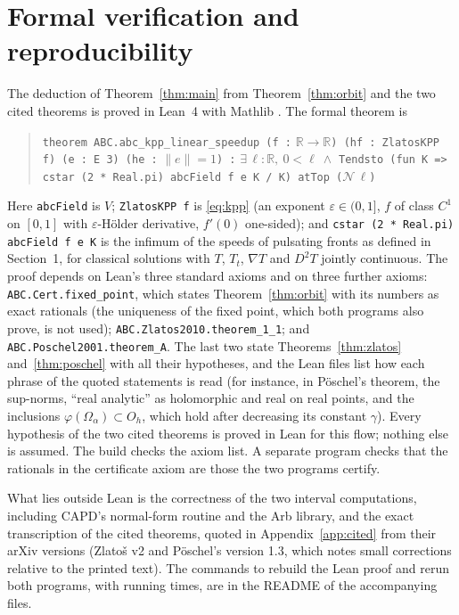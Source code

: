 \documentclass[11pt]{article}
\theoremstyle{definition}
\theoremstyle{remark}
\newcommand{\R}{\mathbb{R}}
\begin{document}
\section{Formal verification and reproducibility}\label{sec:lean}
The deduction of Theorem~\ref{thm:main} from Theorem~\ref{thm:orbit} and the
two cited theorems is proved in Lean~4 \cite{Lean} with Mathlib
\cite{Mathlib}. The formal theorem is
\begin{quote}\raggedright
\texttt{theorem ABC.abc\_kpp\_linear\_speedup (f :} $\R\to\R$\texttt{) (hf : ZlatosKPP f) (e : E 3) (he :} $\|e\|=1$\texttt{) :}
$\exists\,\ell:\R,\ 0<\ell\ \wedge$ \texttt{Tendsto (fun K => cstar (2 * Real.pi) abcField f e K / K) atTop (}$\mathcal N\,\ell$\texttt{)}
\end{quote}
Here \texttt{abcField} is $V$; \texttt{ZlatosKPP f} is \eqref{eq:kpp} (an
exponent $\varepsilon\in(0,1]$, $f$ of class $C^1$ on $[0,1]$ with
$\varepsilon$-Hölder derivative, $f'(0)$ one-sided); and
\texttt{cstar (2 * Real.pi) abcField f e K} is the infimum of the speeds of
pulsating fronts as defined in Section~1, for classical solutions with $T$,
$T_t$, $\nabla T$ and $D^2T$ jointly continuous. The proof depends on
Lean's three standard axioms and on three further axioms:
\texttt{ABC.Cert.fixed\_point}, which states Theorem~\ref{thm:orbit} with its
numbers as exact rationals (the uniqueness of the fixed point, which both
programs also prove, is not used); \texttt{ABC.Zlatos2010.theorem\_1\_1}; and
\texttt{ABC.Poschel2001.theorem\_A}. The last two state
Theorems~\ref{thm:zlatos} and~\ref{thm:poschel} with all their hypotheses, and
the Lean files list how each phrase of the quoted statements is read (for
instance, in Pöschel's theorem, the sup-norms, ``real analytic'' as holomorphic and real
on real points, and the inclusions $\varphi(\Omega_\alpha)\subset O_h$, which
hold after decreasing its constant $\gamma$). Every hypothesis of the two
cited theorems is proved in Lean for this flow; nothing else is assumed. The
build checks the axiom list. A separate program checks that the rationals in the
certificate axiom are those the two programs certify.

What lies outside Lean is the correctness of the two interval computations,
including CAPD's normal-form routine and the Arb library, and the exact
transcription of the cited theorems, quoted in Appendix~\ref{app:cited} from
their arXiv versions (Zlatoš v2 and Pöschel's version 1.3, which notes small
corrections relative to the printed text). The commands to rebuild the Lean
proof and rerun both programs, with running times, are in the README of the
accompanying files.
\end{document}
